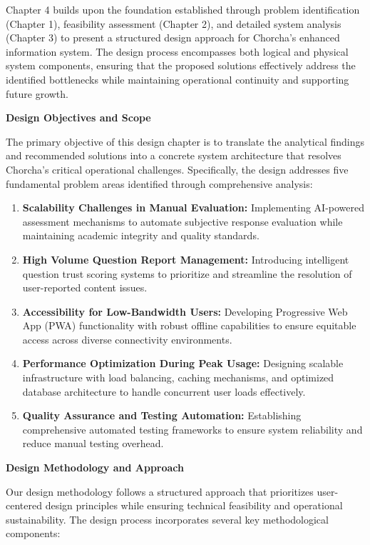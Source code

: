 \documentclass[12pt,a4paper,oneside]{book}
\begin{document}
Chapter 4 builds upon the foundation established through problem identification (Chapter 1), feasibility assessment (Chapter 2), and detailed system analysis (Chapter 3) to present a structured design approach for Chorcha's enhanced information system. The design process encompasses both logical and physical system components, ensuring that the proposed solutions effectively address the identified bottlenecks while maintaining operational continuity and supporting future growth.

\textbf{Design Objectives and Scope}

The primary objective of this design chapter is to translate the analytical findings and recommended solutions into a concrete system architecture that resolves Chorcha's critical operational challenges. Specifically, the design addresses five fundamental problem areas identified through comprehensive analysis:

\begin{enumerate}
    \item \textbf{Scalability Challenges in Manual Evaluation:} Implementing AI-powered assessment mechanisms to automate subjective response evaluation while maintaining academic integrity and quality standards.
    
    \item \textbf{High Volume Question Report Management:} Introducing intelligent question trust scoring systems to prioritize and streamline the resolution of user-reported content issues.
    
    \item \textbf{Accessibility for Low-Bandwidth Users:} Developing Progressive Web App (PWA) functionality with robust offline capabilities to ensure equitable access across diverse connectivity environments.
    
    \item \textbf{Performance Optimization During Peak Usage:} Designing scalable infrastructure with load balancing, caching mechanisms, and optimized database architecture to handle concurrent user loads effectively.
    
    \item \textbf{Quality Assurance and Testing Automation:} Establishing comprehensive automated testing frameworks to ensure system reliability and reduce manual testing overhead.
\end{enumerate}

\textbf{Design Methodology and Approach}

Our design methodology follows a structured approach that prioritizes user-centered design principles while ensuring technical feasibility and operational sustainability. The design process incorporates several key methodological components:
\end{document}

